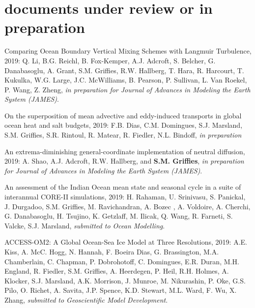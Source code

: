 \section*{\sc \color{Maroon} documents under review or in preparation}

\small 


\begin{etaremune}

\item Comparing Ocean Boundary Vertical Mixing Schemes with Langmuir Turbulence, 2019: Q. Li, B.G. Reichl,     B. Fox-Kemper, A.J. Adcroft, S. Belcher, G. Danabasoglu, A. Grant, S.M. Griffies, R.W. Hallberg, T. Hara, R. Harcourt, T. Kukulka, W.G. Large, J.C. McWilliams, B. Pearson, P. Sullivan, L. Van Roekel, P. Wang, Z. Zheng, {\it in preparation for Journal of Advances in Modeling the Earth System (JAMES)}.

\item On the superposition of mean advective and eddy-induced transports in global ocean heat and salt budgets, 2019: F.B. Dias, C.M. Domingues, S.J. Marsland, S.M. Griffies, S.R. Rintoul, R. Matear, R. Fiedler, N.L. Bindoff, {\it in preparation}

\item An extrema-diminishing general-coordinate implementation of neutral diffusion, 2019: A. Shao, A.J. Adcroft, R.W. Hallberg, and {\bf S.M. Grif\/f\/ies}, {\it in preparation for Journal of Advances in Modeling the Earth System (JAMES)}.

\item An assessment of the Indian Ocean mean state and seasonal cycle in a suite of interannual CORE-II simulations, 2019: H. Rahaman, U. Srinivasu,  S. Panickal, J. Durgadoo, S.M. Griffies, M. Ravichandran, A. Bozec , A. Voldoire, A. Cherchi, G. Danabasoglu, H. Tsujino, K. Getzlaff, M. Ilicak, Q. Wang, R. Farneti, S. Valcke, S.J. Marsland, {\it submitted to Ocean Modelling}.

\item ACCESS-OM2: A Global Ocean-Sea Ice Model at Three Resolutions, 2019: A.E. Kiss, A. McC. Hogg, N. Hannah, 
F. Boeira Dias, G. Brassington, M.A. Chamberlain, C. Chapman, P. Dobrohotoff, C. Domingues, E.R. Duran, M.H. England, R. Fiedler, S.M. Grif\/f\/ies,  A. Heerdegen, P. Heil, R.H. Holmes, A. Klocker, S.J. Marsland, A.K. Morrison, J. Munroe, M. Nikurashin, P. Oke, G.S. Pilo,
O. Richet, A. Savita, J.P. Spence, K.D. Stewart, M.L. Ward, F. Wu, X. Zhang, {\it submitted to Geoscientific Model Development}.  


\end{etaremune}
